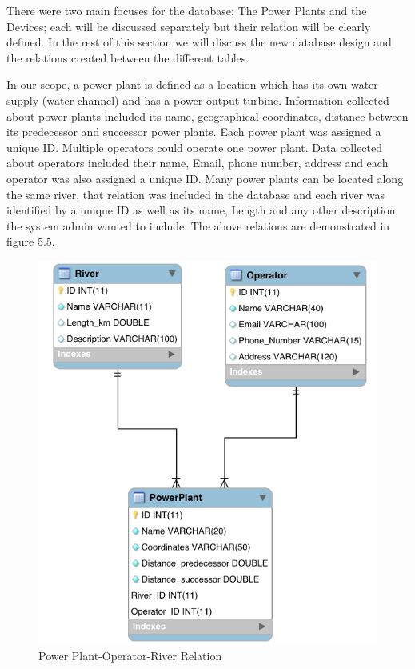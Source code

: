 There were two main focuses for the database; The Power Plants and the Devices; each will be discussed separately but their relation will be clearly defined. In the rest of this section we will discuss the new database design and the relations created between the different tables.

In our scope, a power plant is defined as a location which has its own water supply (water channel) and has a power output turbine. Information collected about power plants included its name, geographical coordinates, distance between its predecessor and successor power plants. Each power plant was assigned a unique ID. Multiple operators could operate one power plant. Data collected about operators included their name, Email, phone number, address and each operator was also assigned a unique ID. Many power plants can be located along the same river, that relation was included in the database and each river was identified by a unique ID as well as its name, Length and any other description the system admin wanted to include. The above relations are demonstrated in figure 5.5.
\begin{figure}[H]
\centering
\includegraphics[scale=0.4]{Images/PP_River_Operator.png}
\caption[Power Plant-Operator-River Relation]{Power Plant-Operator-River Relation}
\end{figure}
